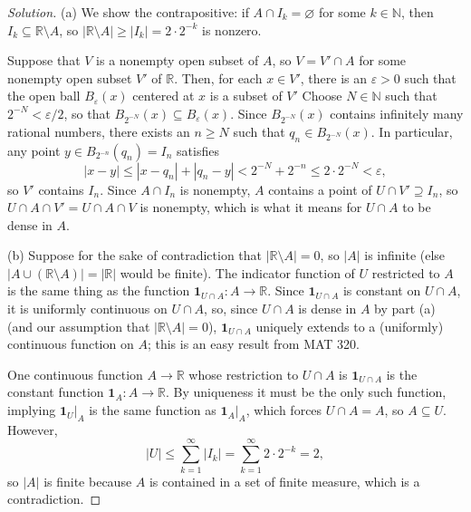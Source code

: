 \documentclass[10pt]{article}
\providecommand{\eps}{\varepsilon}
\providecommand{\NN}{\mathbb N}
\providecommand{\RR}{\mathbb R}
\newenvironment{soln}{\begin{proof}[Solution]}{\end{proof}}
\providecommand{\abs}[1]{\left|#1\right|}
\begin{document}
\begin{soln}
    (a) We show the contrapositive:
    if $A\cap I_k = \varnothing$ for some $k\in\NN$,
    then $I_k\subseteq\RR\setminus A$,
    so $\abs{\RR\setminus A}\ge \abs{I_k} = 2\cdot 2^{-k}$ is nonzero.

    Suppose that $V$ is a nonempty open subset of $A$, so
    $V = V'\cap A$ for some nonempty open subset $V'$ of $\RR$.
    Then, for each $x\in V'$, there is an $\eps>0$ such that
    the open ball $B_\eps(x)$ centered at $x$ is a subset of $V'$
    Choose $N\in\NN$ such that $2^{-N} < \eps/2$, so that
    $B_{2^{-N}}(x)\subseteq B_\eps(x)$.
    Since $B_{2^{-N}}(x)$ contains infinitely many rational numbers,
    there exists an $n\ge N$ such that $q_n\in B_{2^{-N}}(x)$.
    In particular, any point $y\in B_{2^{-n}}(q_n) = I_n$ satisfies
    \begin{equation*}
	\abs{x - y} \le \abs{x-q_n} + \abs{q_n-y} <
	2^{-N} + 2^{-n} \le 2\cdot 2^{-N} < \eps,
    \end{equation*}
    so $V'$ contains $I_n$. Since $A\cap I_n$ is nonempty, $A$ contains a point of
    $U\cap V'\supseteq I_n$, so $U\cap A\cap V' = U\cap A\cap V$ is nonempty,
    which is what it means for $U\cap A$ to be dense in $A$.

    (b) Suppose for the sake of contradiction that
    $\abs{\RR\setminus A} = 0$, so $\abs A$ is infinite
    (else $\abs{A\cup(\RR\setminus A)} = \abs\RR$ would be finite).
    The indicator function of $U$ restricted to $A$
    is the same thing as the function $\mathbf 1_{U\cap A}\colon A\to\RR$.
    Since $\mathbf 1_{U\cap A}$ is constant on $U\cap A$,
    it is uniformly continuous on $U\cap A$, so, since $U\cap A$ is dense in $A$
    by part (a) (and our assumption that $\abs{\RR\setminus A} = 0$),
    $\mathbf 1_{U\cap A}$ uniquely extends to a (uniformly)
    continuous function on $A$; this is an easy result from MAT 320.

    One continuous function $A\to\RR$ whose restriction to $U\cap A$
    is $\mathbf 1_{U\cap A}$ is the constant function $\mathbf 1_A\colon A\to\RR$.
    By uniqueness it must be the only such function,
    implying $\mathbf 1_U|_A$ is the same function as $\mathbf 1_A|_A$,
    which forces $U\cap A = A$, so $A\subseteq U$. However,
    \begin{equation*}
	\abs U \le \sum_{k=1}^\infty \abs{I_k} =
	\sum_{k=1}^\infty 2\cdot 2^{-k} = 2,
    \end{equation*}
    so $\abs A$ is finite because $A$ is contained in a set of finite measure,
    which is a contradiction.
\end{soln}
\end{document}
